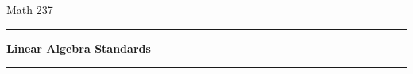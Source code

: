\documentclass[letterpaper]{article}
\begin{document}
\pagestyle{empty}
\noindent Math 237 \hfill \sem \hfill \prof
\vspace{0.3in}
\hrule
\begin{center}{\large \bf Linear Algebra Standards}\end{center}
\hrule
\vspace{0.1in}


\end{document}
